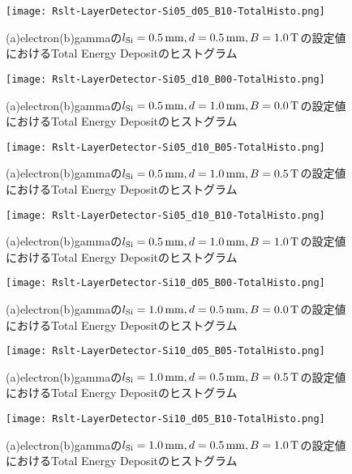 \documentclass[a4paper,10pt]{jreport}
\begin{document}
\begin{figure}[H]
	\center
	\texttt{[image: Rslt-LayerDetector-Si05\_d05\_B10-TotalHisto.png]}
	\caption{(a)electron(b)gammaの$l_{\rm{Si}}=\SI{0.5}{mm}, d=\SI{0.5}{mm}, B=\SI{1.0}{T}$の設定値におけるTotal Energy Depositのヒストグラム}
	\label{Rslt-LayerDetector-Si05_d05_B10-TotalHisto}
\end{figure}

\begin{figure}[H]
	\center
	\texttt{[image: Rslt-LayerDetector-Si05\_d10\_B00-TotalHisto.png]}
	\caption{(a)electron(b)gammaの$l_{\rm{Si}}=\SI{0.5}{mm}, d=\SI{1.0}{mm}, B=\SI{0.0}{T}$の設定値におけるTotal Energy Depositのヒストグラム}
	\label{Rslt-LayerDetector-Si05_d10_B00-TotalHisto}
\end{figure}

\begin{figure}[H]
	\center
	\texttt{[image: Rslt-LayerDetector-Si05\_d10\_B05-TotalHisto.png]}
	\caption{(a)electron(b)gammaの$l_{\rm{Si}}=\SI{0.5}{mm}, d=\SI{1.0}{mm}, B=\SI{0.5}{T}$の設定値におけるTotal Energy Depositのヒストグラム}
	\label{Rslt-LayerDetector-Si05_d10_B05-TotalHisto}
\end{figure}

\begin{figure}[H]
	\center
	\texttt{[image: Rslt-LayerDetector-Si05\_d10\_B10-TotalHisto.png]}
	\caption{(a)electron(b)gammaの$l_{\rm{Si}}=\SI{0.5}{mm}, d=\SI{1.0}{mm}, B=\SI{1.0}{T}$の設定値におけるTotal Energy Depositのヒストグラム}
	\label{Rslt-LayerDetector-Si05_d10_B10-TotalHisto}
\end{figure}

\begin{figure}[H]
	\center
	\texttt{[image: Rslt-LayerDetector-Si10\_d05\_B00-TotalHisto.png]}
	\caption{(a)electron(b)gammaの$l_{\rm{Si}}=\SI{1.0}{mm}, d=\SI{0.5}{mm}, B=\SI{0.0}{T}$の設定値におけるTotal Energy Depositのヒストグラム}
	\label{Rslt-LayerDetector-Si10_d05_B00-TotalHisto}
\end{figure}

\begin{figure}[H]
	\center
	\texttt{[image: Rslt-LayerDetector-Si10\_d05\_B05-TotalHisto.png]}
	\caption{(a)electron(b)gammaの$l_{\rm{Si}}=\SI{1.0}{mm}, d=\SI{0.5}{mm}, B=\SI{0.5}{T}$の設定値におけるTotal Energy Depositのヒストグラム}
	\label{Rslt-LayerDetector-Si10_d05_B05-TotalHisto}
\end{figure}

\begin{figure}[H]
	\center
	\texttt{[image: Rslt-LayerDetector-Si10\_d05\_B10-TotalHisto.png]}
	\caption{(a)electron(b)gammaの$l_{\rm{Si}}=\SI{1.0}{mm}, d=\SI{0.5}{mm}, B=\SI{1.0}{T}$の設定値におけるTotal Energy Depositのヒストグラム}
	\label{Rslt-LayerDetector-Si10_d05_B10-TotalHisto}
\end{figure}
\end{document}
